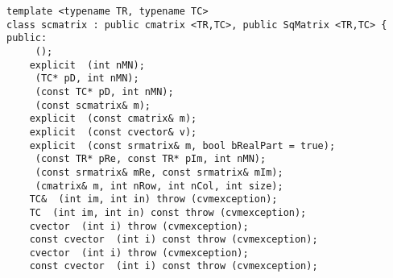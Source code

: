 \bigskip
\noindent
\verb"template <typename TR, typename TC>"\\
\verb"class scmatrix : public cmatrix <TR,TC>, public SqMatrix <TR,TC> {"\\
\verb"public:"\\
\verb"    "\verb" ();"\\
\verb"    explicit "\verb" (int nMN);"\\
\verb"    "\verb" (TC* pD, int nMN);"\\
\verb"    "\verb" (const TC* pD, int nMN);"\\
\verb"    "\verb" (const scmatrix& m);"\\
\verb"    explicit "\verb" (const cmatrix& m);"\\
\verb"    explicit "\verb" (const cvector& v);"\\
\verb"    explicit "\verb" (const srmatrix& m, bool bRealPart = true);"\\
\verb"    "\verb" (const TR* pRe, const TR* pIm, int nMN);"\\
\verb"    "\verb" (const srmatrix& mRe, const srmatrix& mIm);"\\
\verb"    "\verb" (cmatrix& m, int nRow, int nCol, int size);"\\
\verb"    TC& "\verb" (int im, int in) throw (cvmexception);"\\
\verb"    TC "\verb" (int im, int in) const throw (cvmexception);"\\
\verb"    cvector "\verb" (int i) throw (cvmexception);"\\
\verb"    const cvector "\verb" (int i) const throw (cvmexception);"\\
\verb"    cvector "\verb" (int i) throw (cvmexception);"\\
\verb"    const cvector "\verb" (int i) const throw (cvmexception);"\\
